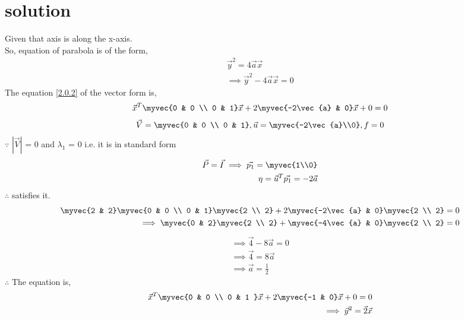 \documentclass[journal,12pt,twocolumn]{IEEEtran}
\begin{document}
\section{solution}
Given that axis is along the x-axis.\\So, equation of parabola is of the form,
\begin{align}
\vec{y}^2 = 4\vec{a}\vec{x}
\\
\implies \vec{y}^2 - 4\vec{a}\vec{x} = 0 \label{2.0.2}
\end{align}
The equation \eqref{2.0.2} of the vector form is,
\begin{align}
\vec{x}^T\myvec{0 & 0 \\ 0 & 1}\vec{x} + 2\myvec{-2\vec{a} & 0}\vec{x} + 0 = 0
\end{align}
\begin{align}
 \vec{V} = \myvec{0 & 0 \\ 0 & 1} ,
 \vec{u} = \myvec{-2\vec{a}\\0} ,
 f = 0
\end{align}
$\because$
$|\vec{V}|$ = 0 and $\lambda_1$ = 0 i.e. it is in standard form
\begin{align}
\vec{P}=\vec{I} \implies \vec{p_1} = \myvec{1\\0}
\\
\eta = \vec{u}^T\vec{p_1} = -2\vec{a}
\end{align}
$\therefore$  satisfies it.
\begin{align}
\myvec{2 & 2}\myvec{0 & 0 \\ 0 & 1} \myvec{2 \\ 2} + 2\myvec{-2\vec{a} & 0}\myvec{2 \\ 2} = 0
\\
\implies \myvec{0 & 2} \myvec{2 \\ 2} + \myvec{-4\vec{a}  & 0}\myvec{2 \\ 2} = 0
\end{align}
\begin{align}
 \implies \vec{4}-8\vec{a} = 0
 \\
 \implies \vec{4}=8\vec{a}
 \\
 \implies \vec{a}=\frac{1}{2}
 \end{align}
 $\therefore$ The equation is,
 \begin{align}
  \vec{x}^T\myvec{0 & 0 \\ 0 & 1 } \vec{x} + 2\myvec{-1 & 0}\vec{x} + 0 = 0  
  \\
  \implies \vec{y}^2 =\vec{2}\vec{x}
 \end{align}
\end{document}
